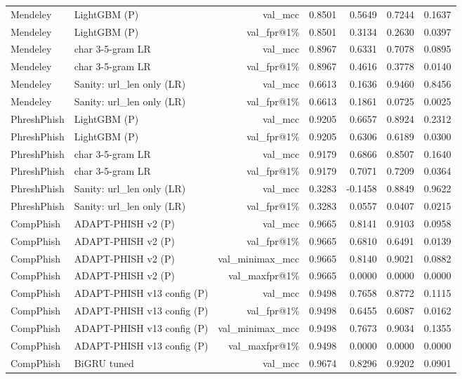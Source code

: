 \begin{table}[t]
\begin{tabular}{llrrrrr}
Mendeley & LightGBM (P) & val\_mcc & 0.8501 & 0.5649 & 0.7244 & 0.1637 \\
Mendeley & LightGBM (P) & val\_fpr@1\% & 0.8501 & 0.3134 & 0.2630 & 0.0397 \\
Mendeley & char 3-5-gram LR & val\_mcc & 0.8967 & 0.6331 & 0.7078 & 0.0895 \\
Mendeley & char 3-5-gram LR & val\_fpr@1\% & 0.8967 & 0.4616 & 0.3778 & 0.0140 \\
Mendeley & Sanity: url\_len only (LR) & val\_mcc & 0.6613 & 0.1636 & 0.9460 & 0.8456 \\
Mendeley & Sanity: url\_len only (LR) & val\_fpr@1\% & 0.6613 & 0.1861 & 0.0725 & 0.0025 \\
PhreshPhish & LightGBM (P) & val\_mcc & 0.9205 & 0.6657 & 0.8924 & 0.2312 \\
PhreshPhish & LightGBM (P) & val\_fpr@1\% & 0.9205 & 0.6306 & 0.6189 & 0.0300 \\
PhreshPhish & char 3-5-gram LR & val\_mcc & 0.9179 & 0.6866 & 0.8507 & 0.1640 \\
PhreshPhish & char 3-5-gram LR & val\_fpr@1\% & 0.9179 & 0.7071 & 0.7209 & 0.0364 \\
PhreshPhish & Sanity: url\_len only (LR) & val\_mcc & 0.3283 & -0.1458 & 0.8849 & 0.9622 \\
PhreshPhish & Sanity: url\_len only (LR) & val\_fpr@1\% & 0.3283 & 0.0557 & 0.0407 & 0.0215 \\
CompPhish & ADAPT-PHISH v2 (P) & val\_mcc & 0.9665 & 0.8141 & 0.9103 & 0.0958 \\
CompPhish & ADAPT-PHISH v2 (P) & val\_fpr@1\% & 0.9665 & 0.6810 & 0.6491 & 0.0139 \\
CompPhish & ADAPT-PHISH v2 (P) & val\_minimax\_mcc & 0.9665 & 0.8140 & 0.9021 & 0.0882 \\
CompPhish & ADAPT-PHISH v2 (P) & val\_maxfpr@1\% & 0.9665 & 0.0000 & 0.0000 & 0.0000 \\
CompPhish & ADAPT-PHISH v13 config (P) & val\_mcc & 0.9498 & 0.7658 & 0.8772 & 0.1115 \\
CompPhish & ADAPT-PHISH v13 config (P) & val\_fpr@1\% & 0.9498 & 0.6455 & 0.6087 & 0.0162 \\
CompPhish & ADAPT-PHISH v13 config (P) & val\_minimax\_mcc & 0.9498 & 0.7673 & 0.9034 & 0.1355 \\
CompPhish & ADAPT-PHISH v13 config (P) & val\_maxfpr@1\% & 0.9498 & 0.0000 & 0.0000 & 0.0000 \\
CompPhish & BiGRU tuned & val\_mcc & 0.9674 & 0.8296 & 0.9202 & 0.0901 \\

\end{tabular}
\end{table}

